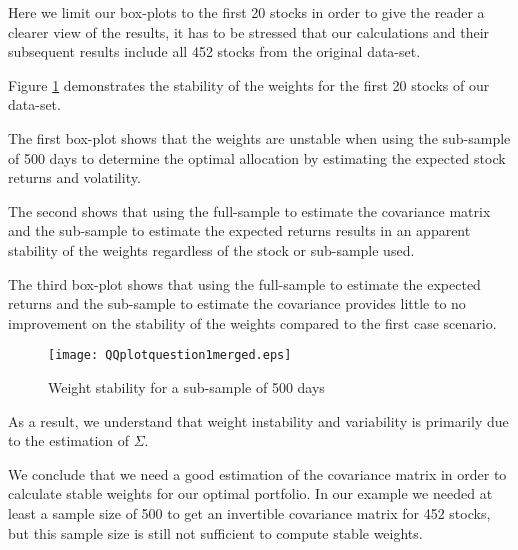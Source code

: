 Here we limit our box-plots to the first 20 stocks in order to give the reader a clearer view of the results, it has to be stressed that our calculations and their subsequent results include all 452 stocks from the original data-set.
\par\smallskip
Figure \ref{fig1} demonstrates the stability of the weights for the first 20 stocks of our data-set.\par
The first box-plot shows that the weights are unstable when using the sub-sample of 500 days to determine the optimal allocation by estimating the expected stock returns and volatility.\par
The second shows that using the full-sample to estimate the covariance matrix and the sub-sample to estimate the expected returns results in an apparent stability of the weights regardless of the stock or sub-sample used.\par
The third box-plot shows that using the full-sample to estimate the expected returns and the sub-sample to estimate the covariance provides little to no improvement on the stability of the weights compared to the first case scenario. 

\begin{figure}[H]
\texttt{[image: QQplotquestion1merged.eps]}
\caption{Weight stability for a sub-sample of 500 days}
\label{fig1}
\end{figure}

As a result, we understand that weight instability and variability is primarily due to the estimation of $\Sigma$.
\par\smallskip
We conclude that we need a good estimation of the covariance matrix in order to calculate stable weights for our optimal portfolio. In our example we needed at least a sample size of 500 to get an invertible covariance matrix for 452 stocks, but this sample size is still not sufficient to compute stable weights.  
 
